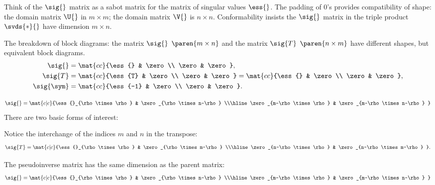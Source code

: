 Think of the $\sig{}$ matrix as a sabot matrix for the matrix of singular values $\ess{}$. The padding of 0's provides compatibility of shape: the domain matrix $\U{}$ in $m \times m$; the domain matrix $\V{}$ is $n \times n$. Conformability insists the $\sig{}$ matrix in the triple product $\svds{*}{}$ have dimension $m \times n$.

The breakdown of block diagrams: the matrix $\sig{}$ $\paren{m \times n}$ and the matrix $\sig{T}$ $\paren{n \times m}$ have different shapes, but equivalent block diagrams.
  \begin{equation*}   %
    \begin{split}
      \sig{}  &= \mat{cc}{\ess{} & \zero \\ \zero & \zero }, \\
      \sig{T} &= \mat{cc}{\ess{T} & \zero \\ \zero & \zero } = \mat{cc}{\ess{} & \zero \\ \zero & \zero }, \\
      \sig{\sym} &= \mat{cc}{\ess{-1} & \zero \\ \zero & \zero }.
    \end{split}
  \end{equation*}

  \begin{equation*}   %
    \begin{split}
       \sig{} = 
         \mat{c|c}{\ess{}_{\rho \times \rho} & \zero_{\rho \times n-\rho} \\\hline \zero_{m-\rho \times \rho} & \zero_{m-\rho \times n-\rho} } \\
    \end{split}
  \end{equation*}
 There are two basic forms of interest: 

Notice the interchange of the indices $m$ and $n$ in the transpose:
  \begin{equation*}   %
    \begin{split}
       \sig{T} = 
         \mat{c|c}{\ess{}_{\rho \times \rho} & \zero_{\rho \times m-\rho} \\\hline \zero_{n-\rho \times \rho} & \zero_{n-\rho \times m-\rho} }.
    \end{split}
  \end{equation*}

The pseudoinverse matrix has the same dimension as the parent matrix:
  \begin{equation*}   %
    \begin{split}
       \sig{} = 
         \mat{c|c}{\ess{}_{\rho \times \rho} & \zero_{\rho \times n-\rho} \\\hline \zero_{m-\rho \times \rho} & \zero_{m-\rho \times n-\rho} } \\
    \end{split}
  \end{equation*}

